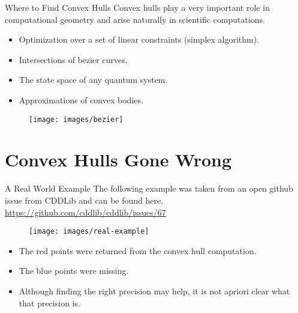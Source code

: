 \documentclass[9pt]{beamer}
\theoremstyle{definition}
\begin{document}
\begin{frame}[fragile]{Where to Find Convex Hulls}
  Convex hulls play a very important role in computational geometry and arise naturally in scientific computations. 

  \begin{itemize}
  \item Optimization over a set of linear constraints (simplex algorithm).
  \item Intersections of bezier curves.
  \item The state space of any quantum system.
  \item Approximations of convex bodies.
  \end{itemize}

  \begin{figure}
    \texttt{[image: images/bezier]}
  \end{figure}

\end{frame}

\section{Convex Hulls Gone Wrong}




\begin{frame}[fragile]{A Real World Example}
  The following example was taken from an open github issue from CDDLib and can be found here.
  \url{https://github.com/cddlib/cddlib/issues/67}

  \begin{figure}
    \texttt{[image: images/real-example]}
  \end{figure}

  \begin{itemize}
  \item The red points were returned from the convex hull computation.
  \item The blue points were missing.
  \item Although finding the right precision may help, it is not apriori clear what that precision is.
  \end{itemize}
  
\end{frame}
\end{document}
